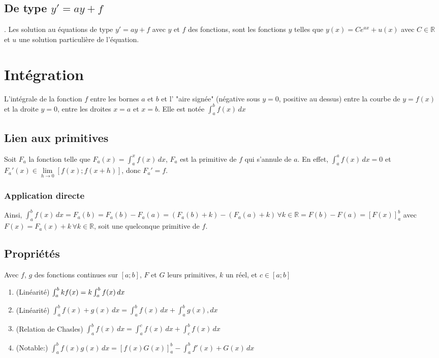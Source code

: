 \documentclass{article}
\begin{document}
\subsection{De type $y'=ay + f$}.
Les solution au équations de type $y'=ay +f$ avec $y$ et $f$ des fonctions, sont les fonctions $y$ telles que $y(x) = Ce^{ax} + u(x)$ avec $C\in\mathbb{R}$ et $u$ une solution particulière de l'équation.

\section{Intégration}
L'intégrale de la fonction $f$ entre les bornes $a$ et $b$ et l' "aire signée" (négative sous $y=0$, positive au dessus) entre la courbe de $y=f(x)$ et la droite $y=0$, entre les droites $x=a$ et $x=b$. Elle est notée $\int_{a}^{b} f(x) \,dx$
\subsection{Lien aux primitives}
Soit $F_a$ la fonction telle que $F_a(x) = \int_{a}^{x}f(x)\,dx$, $F_a$ est la primitive de $f$ qui s'annule de $a$. En effet, $\int_{a}^{a}f(x)\,dx = 0$ et $F_a'(x) \in \lim \limits_{h \rightarrow 0}[f(x);f(x+h)]$, donc $F_a'=f$.
\subsubsection{Application directe}
Ainsi, $\int_{a}^{b}f(x)\,dx = F_a(b) = F_a(b) - F_a(a) = (F_a(b)+k) - (F_a(a)+k)\, \forall k\in\mathbb{R} = F(b)-F(a) = [F(x)]_a^b$ avec $F(x) = F_a(x)+k \, \forall k\in\mathbb{R}$, soit une quelconque primitive de $f$.
\subsection{Propriétés}
Avec $f$, $g$ des fonctions continues sur $[a;b]$, $F$ et $G$ leurs primitives, $k$ un réel, et $c\in[a;b]$
\begin{enumerate}
	\item (Linéarité) $\int_{a}^{b}kf(x)\\ = k\int_{a}^{b}f(x)\,dx$
	\item (Linéarité) $\int_{a}^{b}f(x)+g(x)\,dx = \int_{a}^{b}f(x)\,dx+\int_{a}^{b}g(x),dx$
	\item (Relation de Chasles) $\int_{a}^{b}f(x)\,dx = \int_{a}^{c}f(x)\,dx + \int_{c}^{b}f(x)\,dx$
	\item (Notable:) $\int_{a}^{b}f(x)g(x)\,dx = [f(x)G(x)]_a^b- \int_{a}^{b}f'(x)+G(x)\,dx$
\end{enumerate}
\end{document}
